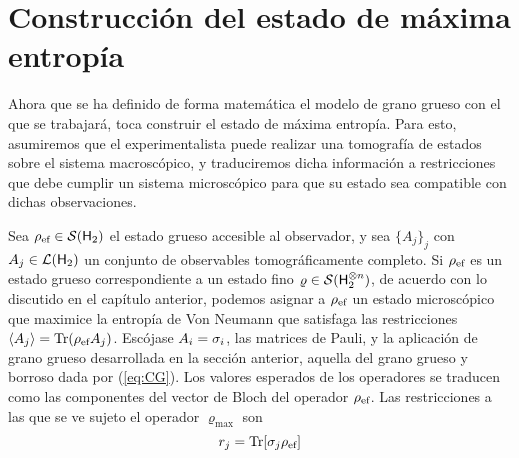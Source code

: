 \section{Construcción del estado de máxima entropía}

Ahora que se ha definido de forma matemática el modelo de grano grueso con el que se trabajará, toca construir el estado de máxima entropía. Para esto, asumiremos que el experimentalista puede realizar una tomografía de estados sobre el sistema macroscópico, y traduciremos dicha información a restricciones que debe cumplir un sistema microscópico para que su estado sea compatible con dichas observaciones. 

Sea $\rho_{\text{ef}}\in\mathcal{S}({\sf H}_{2})$ el estado grueso accesible al observador, y sea $\{A_{j}\}_{j}$ con $A_{j}\in\mathcal{L}({\sf H}_{2})$ un conjunto de observables tomográficamente completo.
Si $\rho_{\text{ef}}$ es un estado grueso correspondiente a un estado fino $\varrho\in\mathcal{S}({\sf H}_{2}^{\otimes n})$, de acuerdo con lo discutido en el capítulo anterior, podemos asignar a $\rho_{\text{ef}}$ un estado microscópico que maximice la entropía de Von Neumann que satisfaga las restricciones $\expval{A_{j}}=\Tr(\rho_{\text{ef}} A_{j})$.
Escójase ${A_{i}}={\sigma_{i}}$, las matrices de Pauli, y la aplicación de grano grueso desarrollada en la sección anterior, aquella del grano grueso y borroso dada por (\ref{eq:CG}). Los valores esperados de los operadores se traducen como las componentes del vector de Bloch del operador $\rho_{\text{ef}}$. Las restricciones a las que se ve sujeto el operador $\varrho_{\max}$ son
\begin{equation}\label{eq:Restrictions}
    r_{j}=\Tr[\sigma_{j}\rho_{\text{ef}}]
\end{equation}

